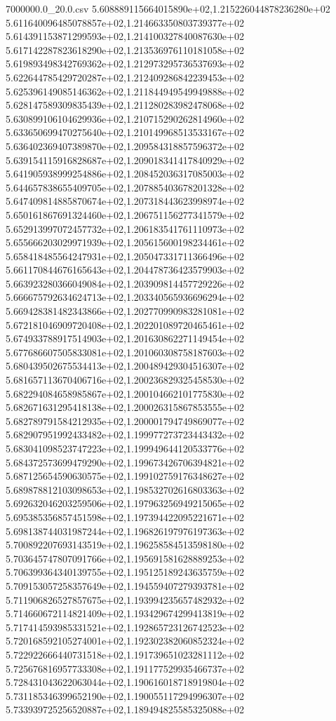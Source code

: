 \begin{filecontents*}{7000000.0_20.0.csv}
5.608889115664015890e+02,1.215226044878236280e+02
5.611640096485078857e+02,1.214663350803739377e+02
5.614391153871299593e+02,1.214100327840087630e+02
5.617142287823618290e+02,1.213536976110181058e+02
5.619893498342769362e+02,1.212973295736537693e+02
5.622644785429720287e+02,1.212409286842239453e+02
5.625396149085146362e+02,1.211844949549949888e+02
5.628147589309835439e+02,1.211280283982478068e+02
5.630899106104629936e+02,1.210715290262814960e+02
5.633650699470275640e+02,1.210149968513533167e+02
5.636402369407389870e+02,1.209584318857596372e+02
5.639154115916828687e+02,1.209018341417840929e+02
5.641905938999254886e+02,1.208452036317085003e+02
5.644657838655409705e+02,1.207885403678201328e+02
5.647409814885870674e+02,1.207318443623998974e+02
5.650161867691324460e+02,1.206751156277341579e+02
5.652913997072457732e+02,1.206183541761110973e+02
5.655666203029971939e+02,1.205615600198234461e+02
5.658418485564247931e+02,1.205047331711366496e+02
5.661170844676165643e+02,1.204478736423579903e+02
5.663923280366049084e+02,1.203909814457729226e+02
5.666675792634624713e+02,1.203340565936696294e+02
5.669428381482343866e+02,1.202770990983281081e+02
5.672181046909720408e+02,1.202201089720465461e+02
5.674933788917514903e+02,1.201630862271149454e+02
5.677686607505833081e+02,1.201060308758187603e+02
5.680439502675534413e+02,1.200489429304516307e+02
5.681657113670406716e+02,1.200236829325458530e+02
5.682294084658985867e+02,1.200104662101775830e+02
5.682671631295418138e+02,1.200026315867853555e+02
5.682789791584212935e+02,1.200001794749869077e+02
5.682907951992433482e+02,1.199977273723443432e+02
5.683041098523747223e+02,1.199949644120533776e+02
5.684372573699479290e+02,1.199673426706394821e+02
5.687125654590630575e+02,1.199102759176348627e+02
5.689878812103098653e+02,1.198532702616803363e+02
5.692632046203259506e+02,1.197963256949215065e+02
5.695385356857451598e+02,1.197394422095221671e+02
5.698138744031987244e+02,1.196826197976197363e+02
5.700892207693143519e+02,1.196258584513598180e+02
5.703645747807091766e+02,1.195691581628889253e+02
5.706399364340139755e+02,1.195125189243635759e+02
5.709153057258357649e+02,1.194559407279393781e+02
5.711906826527857675e+02,1.193994235657482932e+02
5.714660672114821409e+02,1.193429674299413819e+02
5.717414593985331521e+02,1.192865723126742523e+02
5.720168592105274001e+02,1.192302382060852324e+02
5.722922666440731518e+02,1.191739651023281112e+02
5.725676816957733308e+02,1.191177529935466737e+02
5.728431043622063044e+02,1.190616018718919804e+02
5.731185346399652190e+02,1.190055117294996307e+02
5.733939725256520887e+02,1.189494825585325088e+02

\end{filecontents*}
